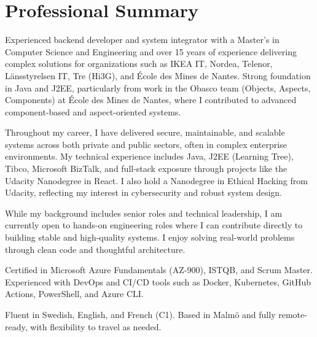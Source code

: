 \section*{Professional Summary}
Experienced backend developer and system integrator with a Master’s in Computer Science and Engineering and over 15 years of experience delivering complex solutions for organizations such as IKEA IT, Nordea, Telenor, Länsstyrelsen IT, Tre (Hi3G), and École des Mines de Nantes. Strong foundation in Java and J2EE, particularly from work in the Obasco team (Objects, Aspects, Components) at École des Mines de Nantes, where I contributed to advanced component-based and aspect-oriented systems.

Throughout my career, I have delivered secure, maintainable, and scalable systems across both private and public sectors, often in complex enterprise environments. My technical experience includes Java, J2EE (Learning Tree), Tibco, Microsoft BizTalk, and full-stack exposure through projects like the Udacity Nanodegree in React. I also hold a Nanodegree in Ethical Hacking from Udacity, reflecting my interest in cybersecurity and robust system design.

While my background includes senior roles and technical leadership, I am currently open to hands-on engineering roles where I can contribute directly to building stable and high-quality systems. I enjoy solving real-world problems through clean code and thoughtful architecture.

Certified in Microsoft Azure Fundamentals (AZ-900), ISTQB, and Scrum Master. Experienced with DevOps and CI/CD tools such as Docker, Kubernetes, GitHub Actions, PowerShell, and Azure CLI.

Fluent in Swedish, English, and French (C1). Based in Malmö and fully remote-ready, with flexibility to travel as needed.

